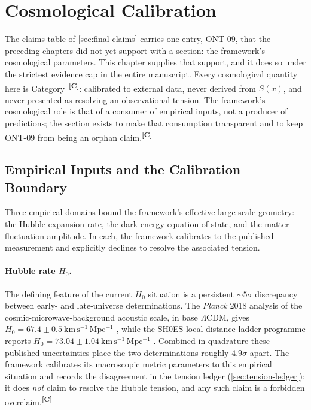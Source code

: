\documentclass[12pt,a4paper,twoside]{article}
\theoremstyle{plain}
\theoremstyle{definition}
\theoremstyle{remark}
\newcommand{\catmark}[1]{\textsuperscript{\textsf{\textbf{[#1]}}}}
\newcommand{\Sx}{S(x)}
\begin{document}
\section{Cosmological Calibration}
\label{sec:cosmological-calibration}

\noindent The claims table of \cref{sec:final-claims} carries one entry, ONT-09, that the preceding chapters did not yet support with a section: the framework's cosmological parameters. This chapter supplies that support, and it does so under the strictest evidence cap in the entire manuscript. Every cosmological quantity here is Category~\catmark{C}: calibrated to external data, never derived from $\Sx$, and never presented as resolving an observational tension. The framework's cosmological role is that of a consumer of empirical inputs, not a producer of predictions; the section exists to make that consumption transparent and to keep ONT-09 from being an orphan claim.\catmark{C}

\subsection{Empirical Inputs and the Calibration Boundary}
\label{subsec:cosmology-inputs}

Three empirical domains bound the framework's effective large-scale geometry: the Hubble expansion rate, the dark-energy equation of state, and the matter fluctuation amplitude. In each, the framework calibrates to the published measurement and explicitly declines to resolve the associated tension.

\paragraph{Hubble rate $H_0$.}
The defining feature of the current $H_0$ situation is a persistent $\sim 5\sigma$ discrepancy between early- and late-universe determinations. The \textit{Planck} 2018 analysis of the cosmic-microwave-background acoustic scale, in base $\Lambda$CDM, gives $H_0 = 67.4 \pm 0.5\ \mathrm{km\,s^{-1}\,Mpc^{-1}}$ \cite{planck2018}, while the SH0ES local distance-ladder programme reports $H_0 = 73.04 \pm 1.04\ \mathrm{km\,s^{-1}\,Mpc^{-1}}$ \cite{riess2022}. Combined in quadrature these published uncertainties place the two determinations roughly $4.9\sigma$ apart. The framework calibrates its macroscopic metric parameters to this empirical situation and records the disagreement in the tension ledger (\cref{sec:tension-ledger}); it does \emph{not} claim to resolve the Hubble tension, and any such claim is a forbidden overclaim.\catmark{C}
\end{document}
